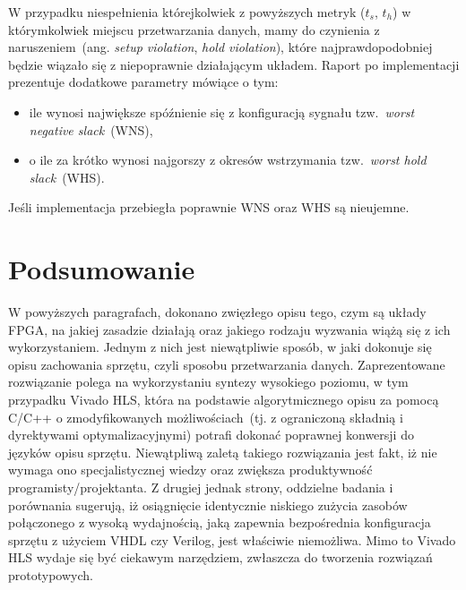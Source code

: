 \begin{itemize}
W przypadku niespełnienia którejkolwiek z powyższych metryk ($t_s$, $t_h$) w którymkolwiek miejscu przetwarzania danych, mamy do czynienia z naruszeniem~(ang. \textit{setup violation}, \textit{hold violation}), które najprawdopodobniej będzie wiązało się z niepoprawnie działającym układem. Raport po implementacji prezentuje dodatkowe parametry mówiące o tym:
\begin{itemize}
\item ile wynosi największe spóźnienie się z konfiguracją sygnału tzw.~\textit{worst negative slack}~(WNS),
\item o ile za krótko wynosi najgorszy z okresów wstrzymania tzw.~\textit{worst hold slack}~(WHS).
\end{itemize}
Jeśli implementacja przebiegła poprawnie WNS oraz WHS są nieujemne.

\end{itemize}


\section*{Podsumowanie}
W powyższych paragrafach, dokonano zwięzłego opisu tego, czym są układy FPGA, na jakiej zasadzie działają oraz jakiego rodzaju wyzwania wiążą się z ich wykorzystaniem. Jednym z nich jest niewątpliwie sposób, w jaki dokonuje się opisu zachowania sprzętu, czyli sposobu przetwarzania danych. Zaprezentowane rozwiązanie polega na wykorzystaniu syntezy wysokiego poziomu, w tym przypadku Vivado HLS, która na podstawie algorytmicznego opisu za pomocą C/C++ o zmodyfikowanych możliwościach~(tj. z ograniczoną składnią i dyrektywami optymalizacyjnymi) potrafi dokonać poprawnej konwersji do języków opisu sprzętu. Niewątpliwą zaletą takiego rozwiązania jest fakt, iż nie wymaga ono specjalistycznej wiedzy oraz zwiększa produktywność programisty/projektanta. Z drugiej jednak strony, oddzielne badania i porównania sugerują, iż osiągnięcie identycznie niskiego zużycia zasobów połączonego z wysoką wydajnością, jaką zapewnia bezpośrednia konfiguracja sprzętu z użyciem VHDL czy Verilog, jest właściwie niemożliwa. Mimo to Vivado HLS wydaje się być ciekawym narzędziem, zwłaszcza do tworzenia rozwiązań prototypowych.
